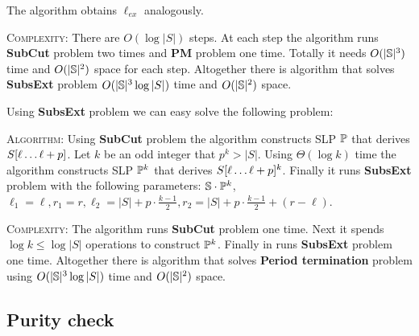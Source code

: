 ﻿\documentclass[11pt]{article}
\begin{document}
The algorithm obtains $\ell_{ex}$ analogously.

\vspace{2pt}

\noindent \textsc{Complexity:} There are $O(\log |S|)$ steps. At each step the algorithm runs \textbf{SubCut} problem
two times and \textbf{PM} problem one time. Totally it needs $O(|\mathbb{S}|^3)$ time and $O(|\mathbb{S}|^2)$ space for each
step. Altogether there is algorithm that solves \textbf{SubsExt} problem $O(|\mathbb{S}|^3 \log|S|)$ time and 
$O(|\mathbb{S}|^2)$ space.

Using \textbf{SubsExt} problem we can easy solve the following problem:


\vspace{2pt}

\noindent \textsc{Algorithm:} Using \textbf{SubCut} problem the algorithm constructs SLP $\mathbb{P}$ that derives
$S[\ell\dots\ell + p]$. Let $k$ be an odd integer that $p^k > |S|$. Using $\Theta(\log k)$ time the algorithm constructs
SLP $\mathbb{P}^k$ that derives $S[\ell\dots\ell+p]^k$. Finally it runs \textbf{SubsExt} problem with the following parameters:
$\mathbb{S} \cdot \mathbb{P}^k$, $\ell_1 = \ell, r_1 = r, \ell_2 = |S| + p \cdot \frac{k-1}{2}, r_2 = |S| + p \cdot \frac{k-1}{2} + (r
- \ell)$.

\vspace{2pt}

\noindent \textsc{Complexity:} The algorithm runs \textbf{SubCut} problem one time. Next it spends $\log k \leq \log
|S|$ operations to construct $\mathbb{P}^k$. Finally in runs \textbf{SubsExt} problem one time. Altogether there is
algorithm that solves \textbf{Period termination} problem using $O(|\mathbb{S}|^3 \log|S|)$ time and
$O(|\mathbb{S}|^2)$ space.

\subsection{Purity check}

\end{document}
